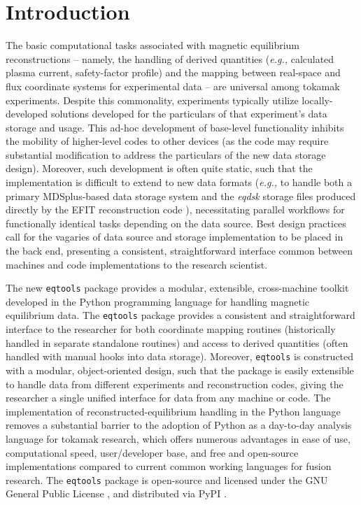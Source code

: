\documentclass{elsarticle}
\newcommand{\eg}{\emph{e.g., }}
\newcommand{\eqtools}{\texttt{eqtools}\xspace}
\begin{document}

\maketitle


\section{Introduction}\label{sec:intro}

The basic computational tasks associated with magnetic equilibrium reconstructions -- namely, the handling of derived quantities (\eg calculated plasma current, safety-factor profile) and the mapping between real-space and flux coordinate systems for experimental data -- are universal among tokamak experiments.  
Despite this commonality, experiments typically utilize locally-developed solutions developed for the particulars of that experiment's data storage and usage.  
This ad-hoc development of base-level functionality inhibits the mobility of higher-level codes to other devices (as the code may require substantial modification to address the particulars of the new data storage design).  
Moreover, such development is often quite static, such that the implementation is difficult to extend to new data formats (\eg to handle both a primary MDSplus-based data storage system \cite{MDSplus} and the \emph{eqdsk} storage files produced directly by the EFIT reconstruction code \cite{Lao1985}), necessitating parallel workflows for functionally identical tasks depending on the data source.  
Best design practices call for the vagaries of data source and storage implementation to be placed in the back end, presenting a consistent, straightforward interface common between machines and code implementations to the research scientist.

The new \eqtools package provides a modular, extensible, cross-machine toolkit developed in the Python programming language for handling magnetic equilibrium data.  
The \eqtools package provides a consistent and straightforward interface to the researcher for both coordinate mapping routines (historically handled in separate standalone routines) and access to derived quantities (often handled with manual hooks into data storage).  
Moreover, \eqtools is constructed with a modular, object-oriented design, such that the package is easily extensible to handle data from different experiments and reconstruction codes, giving the researcher a single unified interface for data from any machine or code.  
The implementation of reconstructed-equilibrium handling in the Python language removes a substantial barrier to the adoption of Python as a day-to-day analysis language for tokamak research, which offers numerous advantages in ease of use, computational speed, user/developer base, and free and open-source implementations compared to current common working languages for fusion research.  The \eqtools package is open-source and licensed under the GNU General Public License \cite{GPL}, and distributed via PyPI \cite{eqtools_pypi,eqtools_git,eqtools_readthedocs}.
\end{document}
